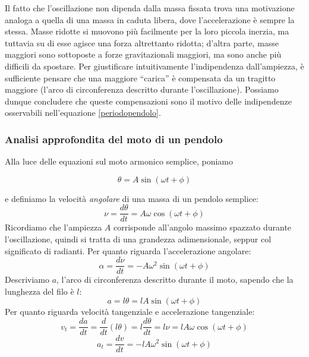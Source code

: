Il fatto che l'oscillazione non dipenda dalla massa fissata trova una
motivazione analoga a quella di una massa in caduta libera, dove
l'accelerazione è sempre la stessa. Masse ridotte si muovono più
facilmente per la loro piccola inerzia, ma tuttavia su di esse agisce
una forza altrettanto ridotta; d'altra parte, masse maggiori sono
sottoposte a forze gravitazionali maggiori, ma sono anche più difficili
da spostare.
Per giustificare intuitivamente l'indipendenza dall'ampiezza, è
sufficiente pensare che una maggiore ``carica'' è compensata da un
tragitto maggiore (l'arco di circonferenza descritto durante
l'oscillazione).
Possiamo dunque concludere che queste compensazioni sono il motivo
delle indipendenze osservabili nell'equazione \ref{periodopendolo}.

\subsubsection*{Analisi approfondita del moto di un pendolo}
Alla luce delle equazioni sul moto armonico semplice, poniamo

\[ \theta = A \sin(\omega t + \phi) \]

\noindent e definiamo la
velocità \textit{angolare} di una massa di un pendolo semplice:
\[ \nu = \frac{d\theta}{dt} = A\omega\cos(\omega t + \phi) \]
Ricordiamo che l'ampiezza $A$ corrisponde all'angolo massimo spazzato
durante l'oscillazione, quindi si tratta di una grandezza adimensionale,
seppur col significato di radianti. Per quanto riguarda l'accelerazione
angolare:
\[ \alpha = \frac{d\nu}{dt} = -A\omega^2\sin(\omega t + \phi) \]
Descriviamo $a$, l'arco di circonferenza descritto durante il moto,
sapendo che la lunghezza del filo è $l$:
\[ a = l\theta = lA\sin(\omega t + \phi) \]
Per quanto riguarda velocità tangenziale e accelerazione tangenziale:
\[ v_t = \frac{da}{dt} = \frac{d}{dt}(l\theta) = l\frac{d\theta}{dt} = l\nu = lA\omega\cos(\omega t + \phi) \]
\[ a_t = \frac{dv}{dt} = -lA\omega^2\sin(\omega t + \phi) \]



